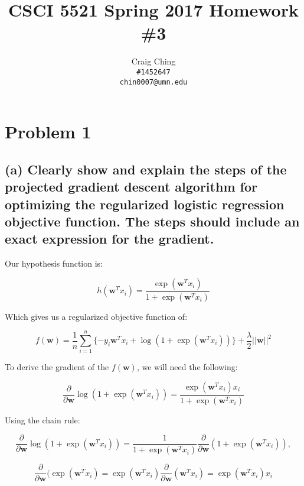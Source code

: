 \documentclass{article}
\author{Craig Ching\\
      \texttt{\#1452647} \\
      \texttt{chin0007@umn.edu}}
\title{
CSCI 5521 Spring 2017 Homework \#3}
\begin{document}
\maketitle

\newcommand{\mysum} {\sum\limits_{i = 1}^n}
\newcommand{\myz} {\mathbf{w}^T x_i}


\section{Problem 1}

\subsection{(a) Clearly show and explain the steps of the projected gradient descent algorithm for optimizing the regularized logistic regression objective function. The steps should include an exact expression for the gradient.}

Our hypothesis function is:

\begin{equation}
h(\myz) = \frac{ \exp ( \myz ) }{ 1 + \exp( \myz ) }
\end{equation}

Which gives us a regularized objective function of:

\begin{equation}
f(\mathbf{w}) = \frac1n \mysum \{-y_i \mathbf{w}^Tx_i + \log(1 + \exp(\mathbf{w}^Tx_i))\} + \frac\lambda2||\mathbf{w}||^2
\end{equation}

To derive the gradient of the $f(\mathbf{w})$, we will need the following:

\begin{equation}
\frac{\partial}{\partial \mathbf{w} }\log( 1 + \exp( \mathbf{w}^Tx_i ) )=\frac{ \exp(\mathbf{w}^Tx_i) x_i }{1 + \exp( \mathbf{w}^Tx_i )}
\end{equation}

Using the chain rule:

\begin{equation}
\frac{\partial}{\partial \mathbf{w} }\log (1 + \exp( \mathbf{w}^Tx_i )) = \frac{1}{1 + \exp( \mathbf{w}^Tx_i )}\frac{\partial}{\partial\mathbf{w}}(1+\exp( \mathbf{w}^Tx_i )),
\end{equation}

\begin{equation}
\frac{\partial}{\partial\mathbf{w}}( \exp( \mathbf{w}^Tx_i ) = \exp( \mathbf{w}^Tx_i)\frac{\partial}{\partial\mathbf{w}}(\mathbf{w}^Tx_i) = \exp( \mathbf{w}^Tx_i ) x_i
\end{equation}
\end{document}
